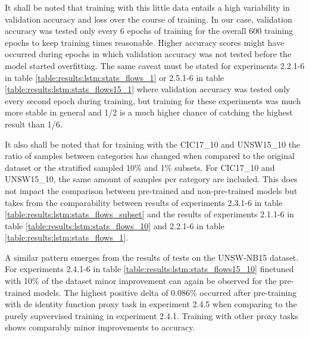 

It shall be noted that training with this little data entails a high variability in validation accuracy and loss over the course of training. In our case, validation accuracy was tested only every 6 epochs of training for the overall 600 training epochs to keep training times reasonable. Higher accuracy scores might have occurred during
epochs in which validation accuracy was not tested before the model started overfitting. The same caveat must be stated for experiments 2.2.1-6 in table \ref{table:results:lstm:stats_flows_1} or 2.5.1-6 in table \ref{table:results:lstm:stats_flows15_1} where validation accuracy was tested only every second epoch during training, but training for these experiments was much more stable in general and 1/2 is a much higher chance of catching the highest result than 1/6. \par 



It also shall be noted that for training with the CIC17\_10 and UNSW15\_10 the ratio of samples between categories has changed when compared to the original dataset or the stratified sampled 10\% and 1\% subsets. For CIC17\_10 and UNSW15\_10, the same amount of samples per category are included. This does not impact the comparison between pre-trained and non-pre-trained models but takes from the comparability between results of experiments 2.3.1-6 in table \ref{table:results:lstm:stats_flows_subset} and the results of experiments 2.1.1-6 in table \ref{table:results:lstm:stats_flows_10} and 2.2.1-6 in table \ref{table:results:lstm:stats_flows_1}. \par
A similar pattern emerges from the results of tests on the UNSW-NB15 dataset. For experiments 2.4.1-6 in table \ref{table:results:lstm:stats_flows15_10} finetuned with 10\% of the dataset minor improvement can again be observed for the pre-trained models. The highest positive delta of 0.086\% occurred after pre-training with de identity function proxy task in experiment 2.4.5 when comparing to the purely supvervised training in experiment 2.4.1. Training with other proxy tasks shows comparably minor improvements to accuracy. \par





